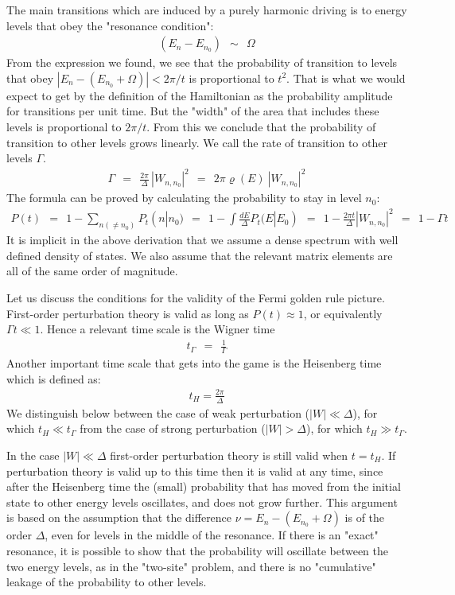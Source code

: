 \documentclass[onecolumn,fleqn]{revtex4}
\newcommand{\gdos}{\varrho} \newcommand{\EPS}{\mathcal{E}}
\newcommand{\beq}{\begin{eqnarray}}
\newcommand{\eeq}{\end{eqnarray}}
\begin{document}
The main transitions which are induced by a purely harmonic driving  
is to energy levels that obey the "resonance condition":
\beq
(E_n-E_{n_0}) \ \ \sim \ \ \Omega 
\eeq
From the expression we found, we see that 
the probability of transition to levels that obey 
${|E_n-(E_{n_0}+\Omega)| < 2\pi/t}$ 
is proportional to ${t^2}$. That is what 
we would expect to get by the definition 
of the Hamiltonian as the probability amplitude 
for transitions per unit time. But the "width" 
of the area that includes these levels is proportional 
to ${2\pi/t}$. From this we conclude that the 
probability of transition to other levels grows linearly. 
We call the rate of transition to other levels ${\Gamma}$.  
\beq
\Gamma \ \ = \ \  
\frac{2\pi}{\Delta} \, |W_{n,n_0}|^2 
\ \ = \ \  
2\pi \gdos(E) \ |W_{n,n_0}|^2 
\eeq
The formula can be proved by calculating 
the probability to stay in level ${n_0}$:
\beq
P(t) \ \ = \ \ 1-\sum_{n (\neq n_0)} P_t(n|n_0) 
\ \ = \ \ 1-\int \frac {dE}{\Delta} P_t(E|E_0) 
\ \ = \ \ 1-\frac{2\pi t}{\Delta}|W_{n,n_0}|^2 
\ \ = \ \ 1-\Gamma t 
\eeq
It is implicit in the above derivation that we assume 
a dense spectrum with well defined density of states. 
We also assume that the relevant matrix elements are 
all of the same order of magnitude. 


Let us discuss the conditions for the validity 
of the Fermi golden rule picture. 
First-order perturbation theory is valid 
as long as  ${P(t) \approx 1}$, 
or equivalently ${\Gamma t \ll 1}$. 
Hence a relevant time scale is the Wigner time   
\beq
t_{\Gamma} \ \ = \ \ \frac{1}{\Gamma}
\eeq
Another important time scale that gets into 
the game is the Heisenberg time which is defined as: 
\beq
t_H =\frac {2\pi}{\Delta} 
\eeq
We distinguish below between the  
case of weak perturbation (${|W| \ll \Delta}$),
for which $t_H \ll t_{\Gamma}$  
from the case of strong perturbation (${|W| > \Delta}$), 
for which $t_H \gg t_{\Gamma}$.


In the case  ${|W| \ll \Delta}$ first-order perturbation theory 
is still valid when ${t=t_H}$. 
If perturbation theory is valid up to this time 
then it is valid at any time, since after 
the Heisenberg time the (small) probability that 
has moved from the initial state to other energy 
levels oscillates, and does not grow further. 
This argument is based on the assumption  
that the difference ${\nu = E_n-(E_{n_0} + \Omega)}$ 
is of the order ${\Delta}$, even for levels 
in the middle of the resonance. If there is 
an "exact" resonance, it is possible to show 
that the probability will oscillate between 
the two energy levels, as in the "two-site" 
problem, and there is no "cumulative" leakage 
of the probability to other levels. 
\end{document}
